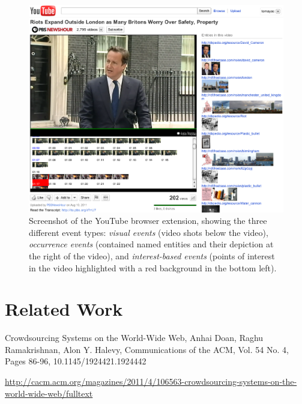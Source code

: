 \documentclass[runningheads,a4paper]{llncs}
\begin{document}
\begin{figure}
\begin{center}
   \includegraphics[width=0.8\linewidth]{./resources/youtube}
\end{center}
   \caption{Screenshot of the YouTube browser extension, showing the three different event types: \emph{visual events} (video shots below the video), \emph{occurrence events} (contained named entities and their depiction at the right of the video), and \emph{interest-based events} (points of interest in the video highlighted with a red background in the bottom left).}
\label{fig:youtube}
\end{figure}


\section{Related Work} \label{sec:related-work}



Crowdsourcing Systems on the World-Wide Web, Anhai Doan, Raghu Ramakrishnan, Alon Y. Halevy, Communications of the ACM,
Vol. 54 No. 4, Pages 86-96, 10.1145/1924421.1924442 

\url{http://cacm.acm.org/magazines/2011/4/106563-crowdsourcing-systems-on-the-world-wide-web/fulltext}
\end{document}

